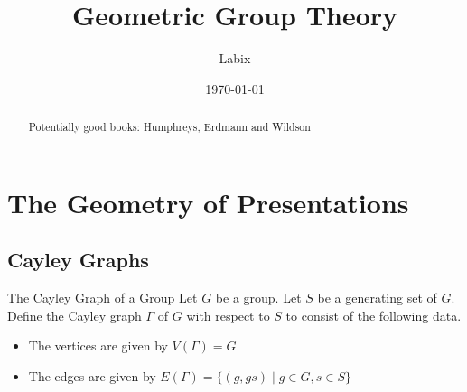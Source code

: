 \documentclass[a4paper]{article}
\title{Geometric Group Theory}
\author{Labix}
\date{\today}
\begin{document}
\maketitle
\begin{abstract}
Potentially good books: Humphreys, Erdmann and Wildson
\end{abstract}
\pagebreak
\tableofcontents

\pagebreak
\section{The Geometry of Presentations}
\subsection{Cayley Graphs}
\begin{defn}{The Cayley Graph of a Group}{} Let $G$ be a group. Let $S$ be a generating set of $G$. Define the Cayley graph $\Gamma$ of $G$ with respect to $S$ to consist of the following data. 
\begin{itemize}
\item The vertices are given by $V(\Gamma)=G$
\item The edges are given by $E(\Gamma)=\{(g,gs)\;|\;g\in G,s\in S\}$
\end{itemize}
\end{defn}
\end{document}

